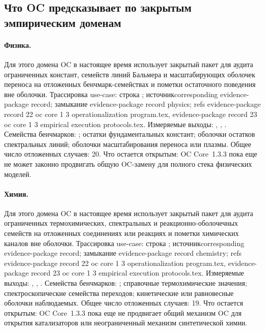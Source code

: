 \subsection{Что OC предсказывает по закрытым эмпирическим доменам}

\paragraph{Физика.}
Для этого домена OC в настоящее время использует закрытый пакет для аудита ограниченных констант, семейств линий Бальмера и масштабирующих оболочек переноса на отложенных бенчмарк-семействах и пометки остаточного поведения вне оболочки.
Трассировка use-case: строка ; \allowbreak источникcorresponding evidence-package record; \allowbreak замыкание evidence-package record physics; \allowbreak refs evidence-package record 22 oc core 1 3 operationalization program.tex, \allowbreak evidence-package record 23 oc core 1 3 empirical execution protocols.tex.
Измеряемые выходы: , , .
Семейства бенчмарков: ; остатки фундаментальных констант; оболочки остатков спектральных линий; оболочки масштабирования переноса или плазмы.
Общее число отложенных случаев: 20.
Что остается открытым: OC Core~1.3.3 пока еще не может законно продвигать общую OC-замену для полного стека физических моделей.

\paragraph{Химия.}
Для этого домена OC в настоящее время использует закрытый пакет для аудита ограниченных термохимических, спектральных и реакционно-оболочечных семейств на отложенных соединениях или реакциях и пометки химических каналов вне оболочки.
Трассировка use-case: строка ; \allowbreak источникcorresponding evidence-package record; \allowbreak замыкание evidence-package record chemistry; \allowbreak refs evidence-package record 22 oc core 1 3 operationalization program.tex, \allowbreak evidence-package record 23 oc core 1 3 empirical execution protocols.tex.
Измеряемые выходы: , , .
Семейства бенчмарков: ; справочные термохимические значения; спектроскопические семейства переходов; кинетические или равновесные оболочки наблюдаемых.
Общее число отложенных случаев: 19.
Что остается открытым: OC Core~1.3.3 пока еще не продвигает общий механизм OC для открытия катализаторов или неограниченный механизм синтетической химии.

